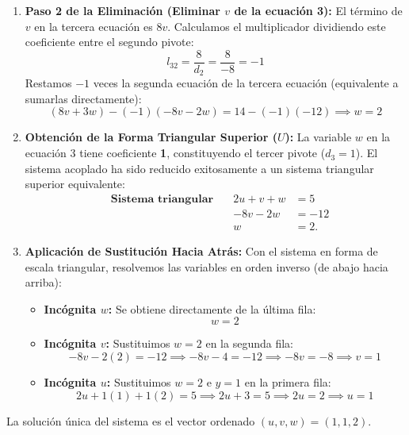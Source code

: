 \documentclass[11pt, a4paper]{article}
\begin{document}
\begin{enumerate}
    \item \textbf{Paso 2 de la Eliminación (Eliminar $v$ de la ecuación 3):}
    El término de $v$ en la tercera ecuación es $8v$. Calculamos el multiplicador dividiendo este coeficiente entre el segundo pivote:
    $$l_{32} = \frac{8}{d_2} = \frac{8}{-8} = -1$$
    Restamos $-1$ veces la segunda ecuación de la tercera ecuación (equivalente a sumarlas directamente):
    $$(8v + 3w) - (-1)(-8v - 2w) = 14 - (-1)(-12) \implies w = 2$$

    \item \textbf{Obtención de la Forma Triangular Superior ($U$):}
    La variable $w$ en la ecuación 3 tiene coeficiente \textbf{1}, constituyendo el tercer pivote ($d_3 = 1$). El sistema acoplado ha sido reducido exitosamente a un sistema triangular superior equivalente:
    \begin{equation}
    \begin{aligned}
      &\textbf{Sistema triangular} \quad & 2u + v + w &= 5 \\
      &                            \quad & -8v - 2w &= -12 \\
      &                            \quad & w &= 2.
    \end{aligned}
    \end{equation}

    \item \textbf{Aplicación de Sustitución Hacia Atrás:}
    Con el sistema en forma de escala triangular, resolvemos las variables en orden inverso (de abajo hacia arriba):
    \begin{itemize}
        \item \textbf{Incógnita $w$:} Se obtiene directamente de la última fila:
        $$w = 2$$
        \item \textbf{Incógnita $v$:} Sustituimos $w = 2$ en la segunda fila:
        $$-8v - 2(2) = -12 \implies -8v - 4 = -12 \implies -8v = -8 \implies v = 1$$
        \item \textbf{Incógnita $u$:} Sustituimos $w = 2$ e $y = 1$ en la primera fila:
        $$2u + 1(1) + 1(2) = 5 \implies 2u + 3 = 5 \implies 2u = 2 \implies u = 1$$
    \end{itemize}
\end{enumerate}
La solución única del sistema es el vector ordenado $(u, v, w) = (1, 1, 2)$.

\end{document}
